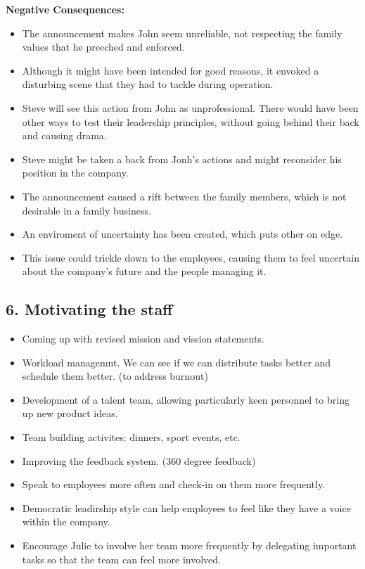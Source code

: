 \documentclass[a4paper,10pt]{article}
\begin{document}
\textbf{Negative Consequences:}
\begin{itemize}
    \item The announcement makes John seem unreliable, not respecting the family values that he preeched and enforced.
    \item Although it might have been intended for good reasons, it envoked a disturbing scene that they had to tackle during operation.
    \item Steve will see this action from John as unprofessional. There would have been other ways to test their leadership principles, without going behind their back and causing drama.
    \item Steve might be taken a back from Jonh's actions and might reconsider his position in the company.
    \item The announcement caused a rift between the family members, which is not desirable in a family business.
    \item An enviroment of uncertainty has been created, which puts other on edge.
    \item This issue could trickle down to the employees, causing them to feel uncertain about the company's future and the people managing it.
\end{itemize}

\subsection{6. Motivating the staff}

\begin{itemize}
    \item Coming up with revised mission and vission statements.
    \item Workload managemnt. We can see if we can distribute tasks better and schedule them better. (to address burnout)
    \item Development of a talent team, allowing particularly keen personnel to bring up new product ideas.
    \item Team building activites: dinners, sport events, etc.
    \item Improving the feedback system. (360 degree feedback)
    \item Speak to employees more often and check-in on them more frequently.
    \item Democratic leadirship style can help employees to feel like they have a voice within the company.
    \item Encourage Julie to involve her team more frequently by delegating important tasks so that the team can feel more involved.
\end{itemize}
\end{document}
